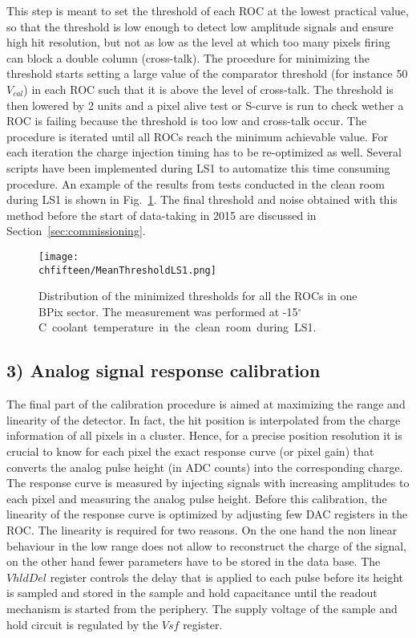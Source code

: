This step is meant to set the threshold of each ROC at the lowest practical value, so that the threshold is low enough to detect low amplitude signals and ensure high hit resolution, but not as low as the level at which too many pixels firing can block a double column (cross-talk).
The procedure for minimizing the threshold starts setting a large value of the comparator threshold (for instance 50 $V_{cal}$) in each ROC such that it is above the level of cross-talk.
The threshold is then lowered by 2 units and a pixel alive test or S-curve is run to check wether a ROC is failing because the threshold is too low and cross-talk occur.
The procedure is iterated until all ROCs reach the minimum achievable value. For each iteration the charge injection timing has to be re-optimized as well.
Several scripts have been implemented during LS1 to automatize this time consuming procedure. An example of the results from tests conducted in the clean room during LS1 is shown in Fig.~\ref{fig:ThrCalibLS1}.
The final threshold and noise obtained with this method before the start of data-taking in 2015 are discussed in Section~\ref{sec:commissioning}.

\begin{figure}[!htb]
\begin{center}
 \texttt{[image: \\chfifteen/MeanThresholdLS1.png]}
 \end{center}
 \caption{Distribution of the minimized thresholds for all the ROCs in one BPix sector. The measurement was performed at -15\unit{$^\circ$C} coolant temperature in the clean room during LS1.}
 \label{fig:ThrCalibLS1}
\end{figure}

\subsection*{3) Analog signal response calibration}

The final part of the calibration procedure is aimed at maximizing the range and linearity of the detector.
In fact, the hit position is interpolated from the charge information of all pixels in a cluster. Hence, for a precise position resolution it is crucial to know for each pixel the exact response curve (or pixel gain) that converts the analog pulse height (in ADC counts) into the corresponding charge.
The response curve is measured by injecting signals with increasing amplitudes to each pixel and measuring the analog pulse height.
Before this calibration, the linearity of the response curve is optimized by adjusting few DAC registers in the ROC.
The linearity is required for two reasons. On the one hand the non linear behaviour in the low range does not allow to reconstruct the charge of the signal, on the other hand fewer parameters have to be stored in the data base.
The $VhldDel$ register controls the delay that is applied to each pulse before its height is sampled and stored in the sample and hold capacitance until the readout mechanism is started from the periphery.
The supply voltage of the sample and hold circuit is regulated by the $Vsf$ register.

